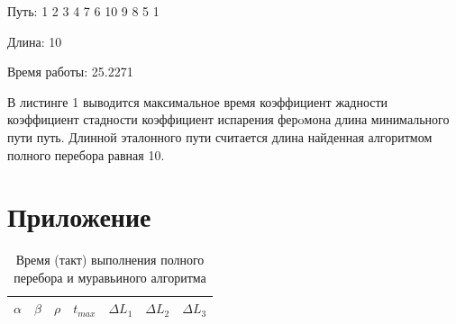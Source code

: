 \documentclass[a4paper,oneside,14pt]{extreport}
\begin{document}
Путь: 1 2 3 4 7 6 10 9 8 5 1 

Длина: 10

Время работы: 25.2271

В листинге 1 выводится максимальное время  коэффициент жадности  коэффициент стадности коэффициент испарения ферoмона длина минимального пути путь. Длинной эталонного пути считается длина найденная алгоритмом полного перебора равная 10.
\chapter*{Приложение}

\begin{table}[h]
\caption{Время (такт) выполнения полного перебора и муравьиного алгоритма}
\label{tbl:only}
\begin{center}
	\begin{tabular}{|c|c|c|c|c|c|c|}
		\hline
		$\alpha$ & $\beta$ & $\rho$ &  $t_{max}$ & $\Delta L_{1}$ & $\Delta L_{2}$ & $\Delta L_{3}$ \\
		\hline
		

\end{tabular}
\end{center}
\end{table}
\end{document}

